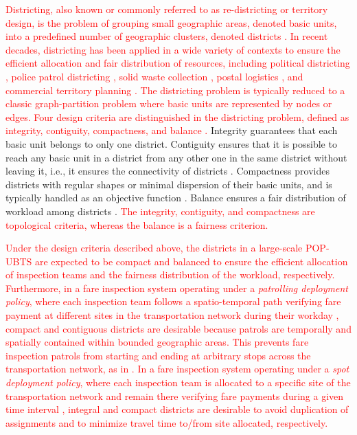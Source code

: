 \documentclass[preprint,11pt]{elsarticle}
\begin{document}
\textcolor{red}{Districting, also known or commonly referred to as re-districting or territory design, is the problem of grouping small geographic areas, denoted basic units, into a predefined number of geographic clusters, denoted districts \citep{Kalcsics2019}. 
In recent decades, districting has been applied in a wide variety of contexts to ensure the efficient allocation and fair distribution of resources, including political districting \citep{Bozkaya2011, Chopra2023, Ricca2016}, police patrol districting \citep{Camacho2015, Liberatore2022}, solid waste collection \citep{Herrera2019, Lin2008}, postal logistics \citep{Alvarez2025, Sandoval2022}, and commercial territory planning \citep{Moya2020, Rios2016, Salazar2011}.
The districting problem is typically reduced to a classic graph-partition problem where basic units are represented by nodes or edges. 
Four design criteria are distinguished in the districting problem, defined as 
integrity, contiguity, compactness, and balance \citep{Simeone2008, Ricca2013, Shirabe2009}.}
Integrity guarantees that each basic unit belongs to only one district.
Contiguity ensures that it is possible to reach any basic unit in a district from any other one in the same district without leaving it, i.e., it ensures the connectivity of districts \citep{Arredondo2021}.
Compactness provides districts with regular shapes or minimal dispersion of their basic units, and is typically handled as an objective function \citep{Borndorfer2023}. 
Balance ensures a fair distribution of workload among districts \citep{Alvarez2025}. 
\textcolor{red}{The integrity, contiguity, and compactness are topological criteria, whereas the balance is a fairness criterion.}

\textcolor{red}{Under the design criteria described above, the districts in a large-scale POP-UBTS are expected to be compact and balanced to ensure the efficient allocation of inspection teams and the fairness distribution of the workload, respectively. 
Furthermore, in a fare inspection system operating under a \textit{patrolling deployment policy}, where each inspection team follows a spatio-temporal path verifying fare payment at different sites in the transportation network during their workday \citep{ Brotcorne2021, Escalona2024, barabino2025comparing},  compact and contiguous districts are desirable because patrols are temporally and spatially contained within bounded geographic areas. 
This prevents fare inspection patrols from starting and ending at arbitrary stops across the transportation network, as in \cite{Brotcorne2021, Escalona2024, yin2012trusts, jiang2013game, jiang2012towards, delfau2018optimization}.
In a fare inspection system operating under a \textit{spot deployment policy}, where each inspection team is allocated to a
specific site of the transportation network and remain there verifying fare payments during a given time interval \citep{Escalona2025}, integral and compact districts are desirable to avoid duplication of assignments and to minimize travel time to/from site allocated, respectively.}
\end{document}
